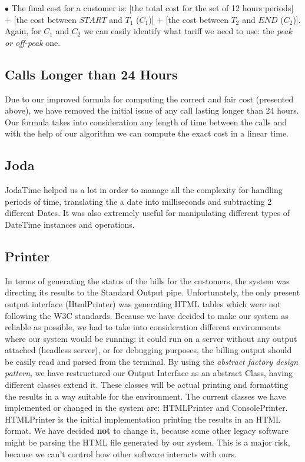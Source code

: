 \documentclass[11pt,twocolumn]{article} %
\begin{document}
$\bullet$ The final cost for a customer is: [the total cost for the set of 12 hours periods] $+$ [the cost between $START$ 
and $T_1$ ($C_1$)] $+$ [the cost between $T_2$ and $END$ ($C_2$)]. 
Again, for $C_1$ and $C_2$ we can easily identify what tariff we need to use: the \textit{peak or off-peak} one.

\subsection{Calls Longer than 24 Hours}

Due to our improved formula for computing the correct and fair cost (presented above), we have removed the initial issue 
of any call lasting longer than 24 hours. Our formula takes into consideration any length of time between the calls and 
with the help of our algorithm we can compute the exact cost in a linear time.

\subsection{Joda}
JodaTime helped us a lot in order to manage all the complexity for handling periods of time,
translating the a date into milliseconds and subtracting 2 different Dates. It was also extremely useful for manipulating 
different types of DateTime instances and operations.

\subsection{Printer}
In terms of generating the status of the bills for the customers, the system was directing its results to the Standard Output pipe. 
Unfortunately, the only present output interface (HtmlPrinter) was generating HTML tables which were not following the W3C standards. 
Because we have decided to make our system as reliable as possible, we had to take into consideration different environments where 
our system would be running: it could run on a server without any output attached (headless server), or for debugging purposes, 
the billing output should be easily read and parsed from the terminal. 
By using the \textit{abstract factory design pattern}, we have restructured our Output Interface as an abstract Class, 
having different classes extend it. These classes will be actual printing and formatting the results in a way suitable for the environment.
The current classes we have implemented or changed in the system are: HTMLPrinter and ConsolePrinter. HTMLPrinter is the initial 
implementation printing the results in an HTML format. We have decided \textbf{not} to change it, because some other legacy software 
might be parsing the HTML file generated by our system. This is a major risk, because we can't control how other software interacts 
with ours. 
\end{document}
